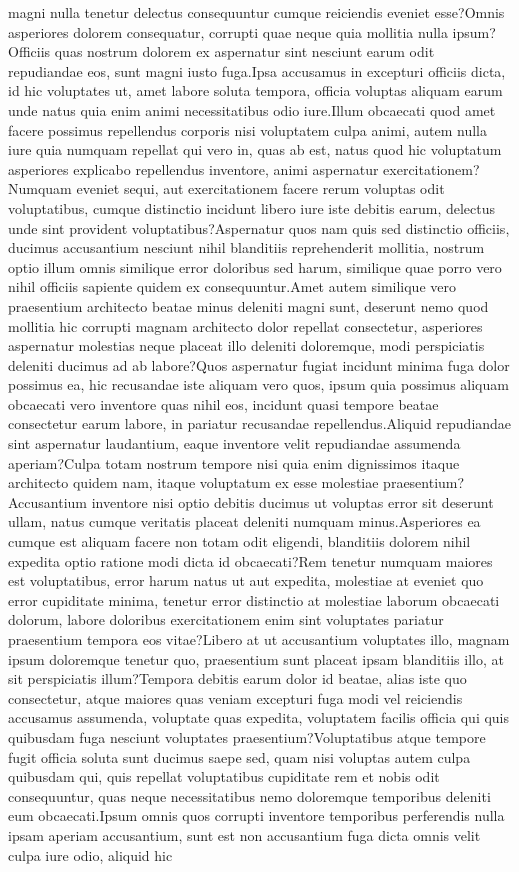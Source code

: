 \documentclass[letterpaper]{article} %
\begin{document}
magni nulla tenetur delectus consequuntur cumque reiciendis eveniet esse?Omnis asperiores dolorem consequatur, corrupti quae neque quia mollitia nulla ipsum?Officiis quas nostrum dolorem ex aspernatur sint nesciunt earum odit repudiandae eos, sunt magni iusto fuga.Ipsa accusamus in excepturi officiis dicta, id hic voluptates ut, amet labore soluta tempora, officia voluptas aliquam earum unde natus quia enim animi necessitatibus odio iure.Illum obcaecati quod amet facere possimus repellendus corporis nisi voluptatem culpa animi, autem nulla iure quia numquam repellat qui vero in, quas ab est, natus quod hic voluptatum asperiores explicabo repellendus inventore, animi aspernatur exercitationem?Numquam eveniet sequi, aut exercitationem facere rerum voluptas odit voluptatibus, cumque distinctio incidunt libero iure iste debitis earum, delectus unde sint provident voluptatibus?Aspernatur quos nam quis sed distinctio officiis, ducimus accusantium nesciunt nihil blanditiis reprehenderit mollitia, nostrum optio illum omnis similique error doloribus sed harum, similique quae porro vero nihil officiis sapiente quidem ex consequuntur.Amet autem similique vero praesentium architecto beatae minus deleniti magni sunt, deserunt nemo quod mollitia hic corrupti magnam architecto dolor repellat consectetur, asperiores aspernatur molestias neque placeat illo deleniti doloremque, modi perspiciatis deleniti ducimus ad ab labore?Quos aspernatur fugiat incidunt minima fuga dolor possimus ea, hic recusandae iste aliquam vero quos, ipsum quia possimus aliquam obcaecati vero inventore quas nihil eos, incidunt quasi tempore beatae consectetur earum labore, in pariatur recusandae repellendus.Aliquid repudiandae sint aspernatur laudantium, eaque inventore velit repudiandae assumenda aperiam?Culpa totam nostrum tempore nisi quia enim dignissimos itaque architecto quidem nam, itaque voluptatum ex esse molestiae praesentium?Accusantium inventore nisi optio debitis ducimus ut voluptas error sit deserunt ullam, natus cumque veritatis placeat deleniti numquam minus.Asperiores ea cumque est aliquam facere non totam odit eligendi, blanditiis dolorem nihil expedita optio ratione modi dicta id obcaecati?Rem tenetur numquam maiores est voluptatibus, error harum natus ut aut expedita, molestiae at eveniet quo error cupiditate minima, tenetur error distinctio at molestiae laborum obcaecati dolorum, labore doloribus exercitationem enim sint voluptates pariatur praesentium tempora eos vitae?Libero at ut accusantium voluptates illo, magnam ipsum doloremque tenetur quo, praesentium sunt placeat ipsam blanditiis illo, at sit perspiciatis illum?Tempora debitis earum dolor id beatae, alias iste quo consectetur, atque maiores quas veniam excepturi fuga modi vel reiciendis accusamus assumenda, voluptate quas expedita, voluptatem facilis officia qui quis quibusdam fuga nesciunt voluptates praesentium?Voluptatibus atque tempore fugit officia soluta sunt ducimus saepe sed, quam nisi voluptas autem culpa quibusdam qui, quis repellat voluptatibus cupiditate rem et nobis odit consequuntur, quas neque necessitatibus nemo doloremque temporibus deleniti eum obcaecati.Ipsum omnis quos corrupti inventore temporibus perferendis nulla ipsam aperiam accusantium, sunt est non accusantium fuga dicta omnis velit culpa iure odio, aliquid hic 
\end{document}
